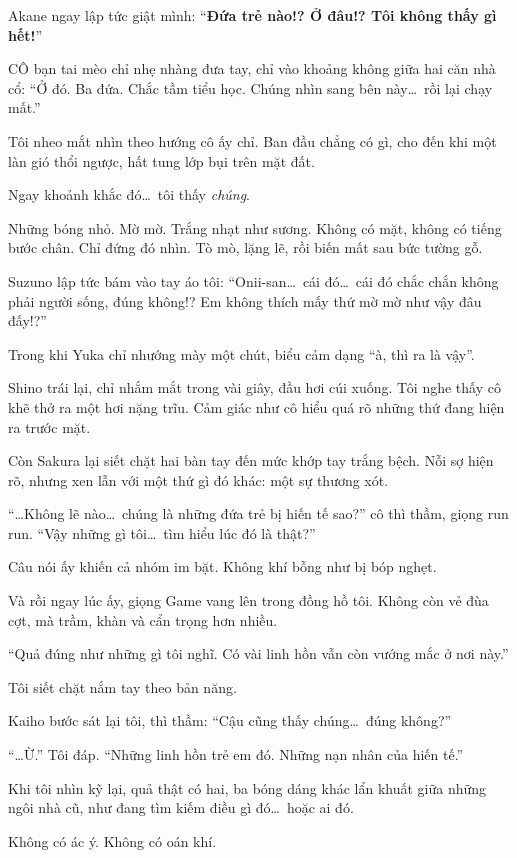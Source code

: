 \documentclass[../main.tex]{subfiles}
\begin{document}
Akane ngay lập tức giật mình: ``\textbf{Đứa trẻ nào!? Ở đâu!? Tôi không thấy gì hết!}''

CÔ bạn tai mèo chỉ nhẹ nhàng đưa tay, chỉ vào khoảng không giữa hai căn nhà cổ: ``Ở đó. Ba đứa. Chắc tầm tiểu học. Chúng nhìn sang bên này\dots\ rồi lại chạy mất.''

Tôi nheo mắt nhìn theo hướng cô ấy chỉ. Ban đầu chẳng có gì, cho đến khi một làn gió thổi ngược, hất tung lớp bụi trên mặt đất.

Ngay khoảnh khắc đó\dots\ tôi thấy \emph{chúng}.

Những bóng nhỏ. Mờ mờ. Trắng nhạt như sương. Không có mặt, không có tiếng bước chân. Chỉ đứng đó nhìn. Tò mò, lặng lẽ, rồi biến mất sau bức tường gỗ.

Suzuno lập tức bám vào tay áo tôi: ``Onii-san\dots\ cái đó\dots\ cái đó chắc chắn không phải người sống, đúng không!? Em không thích mấy thứ mờ mờ như vậy đâu đấy!?''

Trong khi Yuka chỉ nhướng mày một chút, biểu cảm dạng ``à, thì ra là vậy''.

Shino trái lại, chỉ nhắm mắt trong vài giây, đầu hơi cúi xuống. Tôi nghe thấy cô khẽ thở ra một hơi nặng trĩu. Cảm giác như cô hiểu quá rõ những thứ đang hiện ra trước mặt.

Còn Sakura lại siết chặt hai bàn tay đến mức khớp tay trắng bệch. Nỗi sợ hiện rõ, nhưng xen lẫn với một thứ gì đó khác: một sự thương xót.

``\dots Không lẽ nào\dots\ chúng là những đứa trẻ bị hiến tế sao?'' cô thì thầm, giọng run run. ``Vậy những gì tôi\dots\ tìm hiểu lúc đó là thật?''

Câu nói ấy khiến cả nhóm im bặt. Không khí bỗng như bị bóp nghẹt.

Và rồi ngay lúc ấy, giọng Game vang lên trong đồng hồ tôi. Không còn vẻ đùa cợt, mà trầm, khàn và cẩn trọng hơn nhiều.

``Quả đúng như những gì tôi nghĩ. Có vài linh hồn vẫn còn vướng mắc ở nơi này.''

Tôi siết chặt nắm tay theo bản năng.

Kaiho bước sát lại tôi, thì thầm: ``Cậu cũng thấy chúng\dots\ đúng không?''

``\dots Ừ.'' Tôi đáp. ``Những linh hồn trẻ em đó. Những nạn nhân của hiến tế.''

Khi tôi nhìn kỹ lại, quả thật có hai, ba bóng dáng khác lẩn khuất giữa những ngôi nhà cũ, như đang tìm kiếm điều gì đó\dots\ hoặc ai đó.

Không có ác ý. Không có oán khí.
\end{document}
